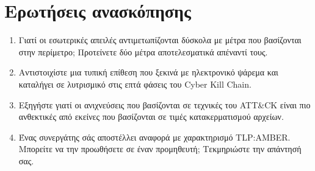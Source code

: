 \section*{Ερωτήσεις ανασκόπησης}
\begin{enumerate}
  \item Γιατί οι εσωτερικές απειλές αντιμετωπίζονται δύσκολα με μέτρα που βασίζονται στην περίμετρο; Προτείνετε δύο μέτρα αποτελεσματικά απέναντί τους.
  \item Αντιστοιχίστε μια τυπική επίθεση που ξεκινά με ηλεκτρονικό ψάρεμα και καταλήγει σε λυτρισμικό στις επτά φάσεις του Cyber Kill Chain.
  \item Εξηγήστε γιατί οι ανιχνεύσεις που βασίζονται σε τεχνικές του ATT\&CK είναι πιο ανθεκτικές από εκείνες που βασίζονται σε τιμές κατακερματισμού αρχείων.
  \item Ένας συνεργάτης σάς αποστέλλει αναφορά με χαρακτηρισμό TLP:AMBER. Μπορείτε να την προωθήσετε σε έναν προμηθευτή; Τεκμηριώστε την απάντησή σας.
\end{enumerate}
